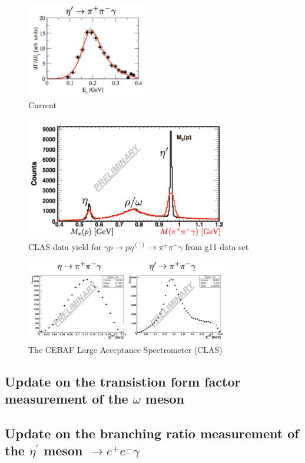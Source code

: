\documentclass{aip-cp}
\begin{document}
\begin{figure}[h]
	\centerline{\includegraphics[width=150pt]{figures/Box_Crystal.pdf}}
	\caption{Current }
	\label{fig:boxcrystal}
\end{figure}
\begin{figure}[h]
	\centerline{\includegraphics[width=250pt]{figures/clas_g11data.pdf}}
	\caption{CLAS data yield for $\gamma p \to p \eta^{(\prime)} \to \pi^+ \pi^- \gamma $ from g11 data set }
	\label{fig:boxCLASdata}
\end{figure}
\begin{figure}[h]
	\centerline{\includegraphics[width=250pt]{figures/Box_CLAS.pdf}}
	\caption{The CEBAF Large Acceptance Spectrometer (CLAS) }
	\label{fig:boxCLAS}
\end{figure}
\subsection{Update on the transistion form factor measurement  of the $\omega$ meson}

\subsection{Update on the branching ratio measurement  of the $\eta^\prime$ meson $\rightarrow e^+e^-\gamma$}
\end{document}
